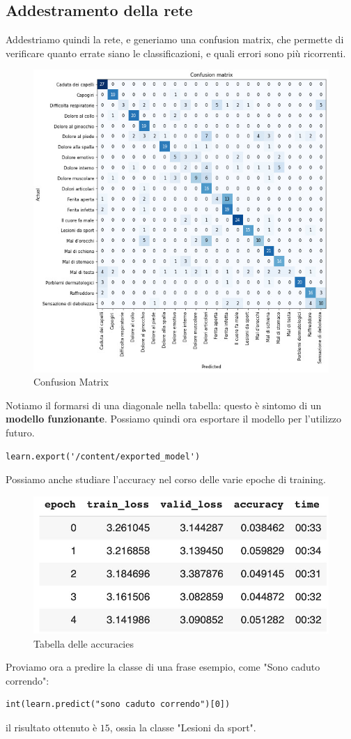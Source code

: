 \subsection{Addestramento della rete}
Addestriamo quindi la rete, e generiamo una confusion matrix, che permette di verificare quanto errate siano le classificazioni, e quali errori sono più ricorrenti.
\begin{figure}[H]
    \begin{center}
        \includegraphics[width=0.8\columnwidth]{images/fallback/ConfusionMatrix.jpg}
    \end{center}
    \caption{Confusion Matrix}
    \label{fig:confusion-matrix}
\end{figure}
Notiamo il formarsi di una diagonale nella tabella: questo è sintomo di un \textbf{modello funzionante}. Possiamo quindi ora esportare il modello per l'utilizzo futuro.
\begin{verbatim}
learn.export('/content/exported_model')
\end{verbatim}
Possiamo anche studiare l'accuracy nel corso delle varie epoche di training.
\begin{figure}[H]
    \begin{center}
        \includegraphics[width=0.5\columnwidth]{images/fallback/Accuracy.jpg}
    \end{center}
    \caption{Tabella delle accuracies}
    \label{fig:accuracy-table}
\end{figure}
Proviamo ora a predire la classe di una frase esempio, come "Sono caduto correndo":
\begin{verbatim}
int(learn.predict("sono caduto correndo")[0])
\end{verbatim}
il risultato ottenuto è $15$, ossia la classe "Lesioni da sport".
